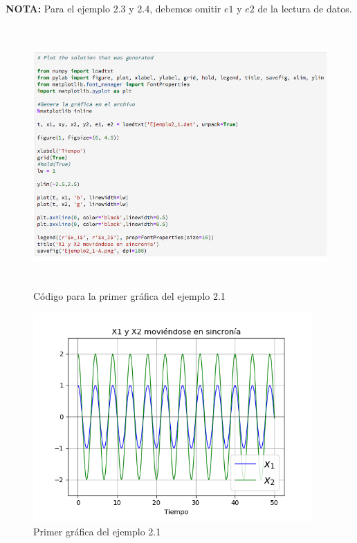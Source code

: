 \noindent \textbf{NOTA:} Para el ejemplo 2.3 y 2.4, debemos omitir $e1$ y $e2$ de la lectura de datos.

\begin{figure}[h!]
	\begin{center}
        \includegraphics[height=10cm]{Ejem2_1-CodA}
        \caption{Código para la primer gráfica del ejemplo 2.1}
        \label{Ejem2.1-CodA}
    \end{center}
\end{figure}
        
\begin{figure}[h!]
	\begin{center}
        \includegraphics[height=8cm]{Ejem2_1-GrafA}
        \caption{Primer gráfica del ejemplo 2.1}
        \label{Ejem2.1-GrafA}
    \end{center}
\end{figure}


